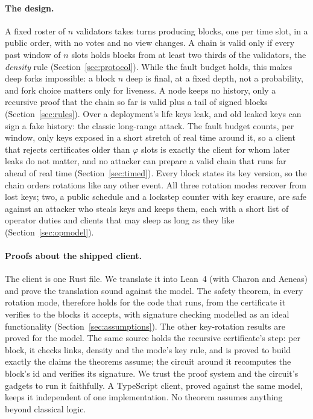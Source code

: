 \documentclass[10pt]{article}
\begin{document}
\paragraph{The design.} A fixed roster of $n$ validators takes turns
producing blocks, one per time slot, in a public order, with no votes and
no view changes. A chain is valid only if every past window of $n$ slots
holds blocks from at least two thirds of the validators, the
\emph{density} rule (Section~\ref{sec:protocol}). While the fault budget
holds, this makes deep forks impossible: a block $n$ deep is final, at a
fixed depth, not a probability, and fork choice matters only for
liveness. A node keeps no history, only a recursive proof that the chain
so far is valid plus a tail of signed blocks (Section~\ref{sec:rules}).
Over a deployment's life keys leak, and old leaked keys can sign a fake
history: the classic long-range attack. The fault budget counts, per
window, only keys exposed in a short stretch of real time around it, so
a client that rejects certificates older than $\varphi$ slots is exactly
the client for whom later leaks do not matter, and no attacker can
prepare a valid chain that runs far ahead of real time
(Section~\ref{sec:timed}). Every block states its key version, so the
chain orders rotations like any other event. All three rotation modes
recover from lost keys; two, a public schedule and a lockstep counter
with key erasure, are safe against an attacker who steals keys and keeps
them, each with a short list of operator duties and clients that may
sleep as long as they like (Section~\ref{sec:opmodel}).

\paragraph{Proofs about the shipped client.} The client is one Rust
file. We translate it into Lean~4 (with Charon and Aeneas) and prove the
translation sound against the model. The safety theorem, in every
rotation mode, therefore holds for the code that runs, from the
certificate it verifies to the blocks it accepts, with signature checking
modelled as an ideal functionality (Section~\ref{sec:assumptions}). The
other key-rotation results are proved for the model. The same source
holds the recursive certificate's step: per block, it checks links,
density and the mode's key rule, and is proved to build exactly the
claims the theorems assume; the circuit around it recomputes the block's
id and verifies its signature. We trust the proof system and the
circuit's gadgets to run it faithfully. A TypeScript client, proved
against the same model, keeps it independent of one implementation. No theorem assumes anything
beyond classical logic.
\end{document}
